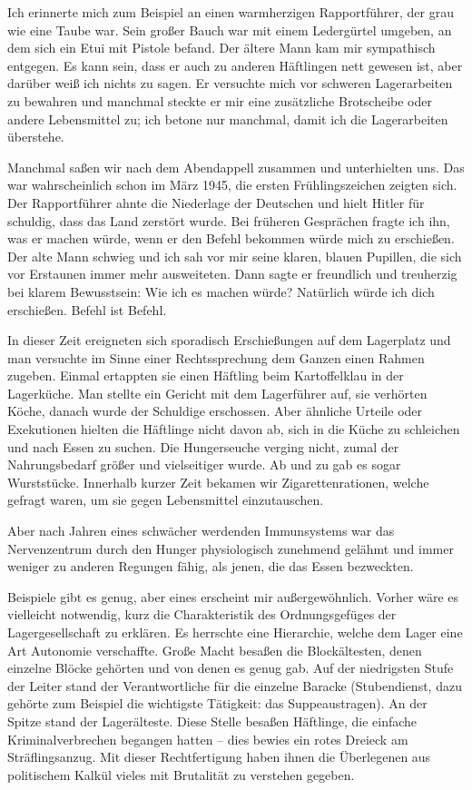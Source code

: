 Ich erinnerte mich zum Beispiel an einen warmherzigen Rapportführer, der grau wie eine Taube war.  Sein großer Bauch war mit einem Ledergürtel umgeben, an dem sich ein Etui mit Pistole befand. Der ältere Mann kam mir sympathisch entgegen. Es kann sein, dass er auch zu anderen Häftlingen nett gewesen ist, aber darüber weiß ich nichts zu sagen. Er versuchte mich vor schweren Lagerarbeiten zu bewahren und manchmal steckte er mir eine zusätzliche Brotscheibe oder andere Lebensmittel zu; ich betone nur manchmal, damit ich die Lagerarbeiten überstehe.

Manchmal saßen wir nach dem Abendappell zusammen und unterhielten uns. 
Das war wahrscheinlich schon im März 1945, die ersten Frühlingszeichen zeigten sich. Der Rapportführer ahnte die Niederlage der Deutschen und hielt Hitler für schuldig, dass das Land zerstört wurde. Bei früheren Gesprächen fragte ich ihn, was er machen würde, wenn er den Befehl bekommen würde mich zu erschießen.
Der alte Mann schwieg und ich sah vor mir seine klaren, blauen Pupillen, die sich vor Erstaunen immer mehr ausweiteten. Dann sagte er freundlich und treuherzig bei klarem Bewusstsein: \glqq Wie ich es machen würde? Natürlich würde ich dich erschießen. Befehl ist Befehl.\grqq

In dieser Zeit ereigneten sich sporadisch Erschießungen auf dem Lagerplatz und man versuchte im Sinne einer Rechtssprechung dem Ganzen einen Rahmen zugeben. Einmal ertappten sie einen Häftling beim Kartoffelklau in der Lagerküche. Man stellte ein Gericht mit dem Lagerführer auf, sie verhörten Köche, danach wurde der Schuldige erschossen. Aber ähnliche Urteile oder Exekutionen hielten die Häftlinge nicht davon ab, sich in die Küche zu schleichen und nach Essen zu suchen. Die Hungerseuche verging nicht, zumal der Nahrungsbedarf größer und vielseitiger wurde. Ab und zu gab es sogar Wurststücke. Innerhalb kurzer Zeit bekamen wir Zigarettenrationen, welche gefragt waren, um sie gegen Lebensmittel einzutauschen.

Aber nach Jahren eines schwächer werdenden Immunsystems war das Nervenzentrum durch den Hunger physiologisch zunehmend gelähmt und immer weniger zu anderen Regungen fähig, als jenen, die das Essen bezweckten.
 
Beispiele gibt es genug, aber eines erscheint mir außergewöhnlich. Vorher wäre es vielleicht notwendig, kurz die Charakteristik des Ordnungsgefüges der Lagergesellschaft zu erklären. Es herrschte eine Hierarchie, welche dem Lager eine Art Autonomie verschaffte. Große Macht besaßen die Blockältesten, denen einzelne Blöcke gehörten und von denen es genug gab. Auf der niedrigsten Stufe der Leiter stand der Verantwortliche für die einzelne Baracke (Stubendienst, dazu gehörte zum Beispiel die wichtigste Tätigkeit: das Suppeaustragen). An der Spitze stand der Lagerälteste. Diese Stelle besaßen Häftlinge, die einfache Kriminalverbrechen begangen hatten -- dies bewies ein rotes Dreieck am Sträflingsanzug. Mit dieser Rechtfertigung haben ihnen die Überlegenen aus politischem Kalkül vieles mit Brutalität zu verstehen gegeben.

